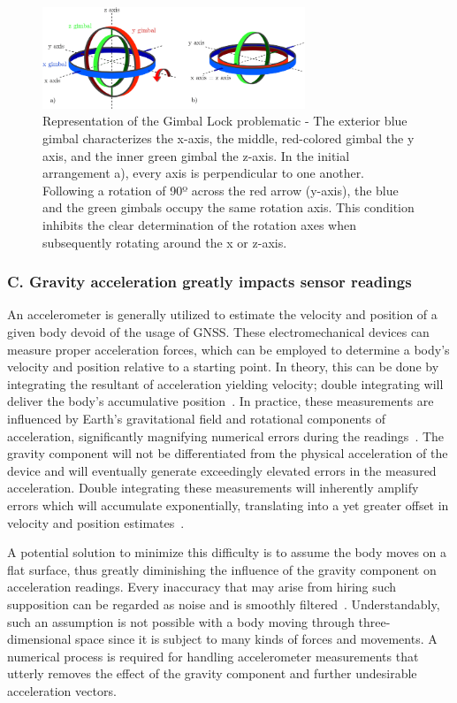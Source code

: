 \begin{figure}[!h]
    \centering
    \includegraphics[width=0.7\textwidth]{figures/gimbal_lock.png}
    \caption{Representation of the Gimbal Lock problematic \cite{zeitlhofler2019nominal} - The exterior blue gimbal characterizes the x-axis, the middle, red-colored gimbal the y axis, and the inner green gimbal the z-axis. In the initial arrangement a), every axis is perpendicular to one another. Following a rotation of 90º across the red arrow (y-axis), the blue and the green gimbals occupy the same rotation axis. This condition inhibits the clear determination of the rotation axes when subsequently rotating around the x or z-axis. }
    \label{fig:gimballock}
\end{figure}

\subsubsection{C. Gravity acceleration greatly impacts sensor readings}
An accelerometer is generally utilized to estimate the velocity and position of a given body devoid of the usage of GNSS. These electromechanical devices can measure proper acceleration forces, which can be employed to determine a body’s velocity and position relative to a starting point. In theory, this can be done by integrating the resultant of acceleration yielding velocity; double integrating will deliver the body’s accumulative position~\cite{yang2006simple}. In practice, these measurements are influenced by Earth’s gravitational field and rotational components of acceleration, significantly magnifying numerical errors during the readings~\cite{nistler2011gravity}. The gravity component will not be differentiated from the physical acceleration of the device and will eventually generate exceedingly elevated errors in the measured acceleration. Double integrating these measurements will inherently amplify errors which will accumulate exponentially, translating into a yet greater offset in velocity and position estimates~\cite{thong2004numerical}.

A potential solution to minimize this difficulty is to assume the body moves on a flat surface, thus greatly diminishing the influence of the gravity component on acceleration readings. Every inaccuracy that may arise from hiring such supposition can be regarded as noise and is smoothly filtered~\cite{nistler2011gravity}. Understandably, such an assumption is not possible with a body moving through three-dimensional space since it is subject to many kinds of forces and movements.  A numerical process is required for handling accelerometer measurements that utterly removes the effect of the gravity component and further undesirable acceleration vectors.





